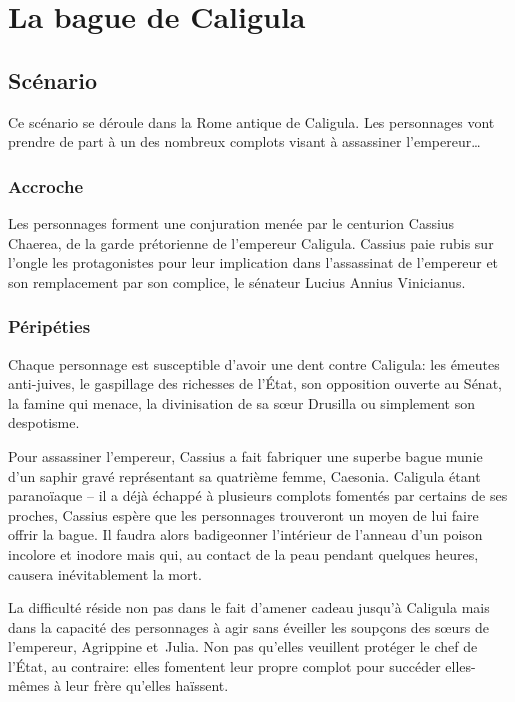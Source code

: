 \chapter{La bague de Caligula}

\section{Scénario}

Ce scénario se déroule dans la Rome antique de Caligula.
Les personnages vont prendre de part à un des nombreux complots visant à assassiner l'empereur\dots

\subsection{Accroche}

Les personnages forment une conjuration menée par le centurion Cassius Chaerea, de la garde prétorienne de l'empereur Caligula.
Cassius paie rubis sur l'ongle les protagonistes pour leur implication dans l'assassinat de l'empereur et son remplacement par son complice, le sénateur Lucius Annius Vinicianus.

\subsection{Péripéties}

Chaque personnage est susceptible d'avoir une dent contre Caligula: les émeutes anti-juives, le gaspillage des richesses de l'État, son opposition ouverte au Sénat, la famine qui menace, la divinisation de sa sœur Drusilla ou simplement son despotisme.

Pour assassiner l'empereur, Cassius a fait fabriquer une superbe bague munie d'un saphir gravé représentant sa quatrième femme, Caesonia.
Caligula étant paranoïaque -- il a déjà échappé à plusieurs complots fomentés par certains de ses proches, Cassius espère que les personnages trouveront un moyen de lui faire offrir la bague.
Il faudra alors badigeonner l'intérieur de l'anneau d'un poison incolore et inodore mais qui, au contact de la peau pendant quelques heures, causera inévitablement la mort.

La difficulté réside non pas dans le fait d'amener cadeau jusqu'à Caligula mais dans la capacité des personnages à agir sans éveiller les soupçons des sœurs de l'empereur, Agrippine et Julia.
Non pas qu'elles veuillent protéger le chef de l'État, au contraire: elles fomentent leur propre complot pour succéder elles-mêmes à leur frère qu'elles haïssent.

